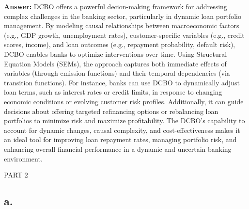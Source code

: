 \documentclass[a4paper,10pt]{article}
\begin{document}
\textbf{Answer:} DCBO offers a powerful decion-making framework for addressing complex challenges in the banking sector, particularly in dynamic loan portfolio management. By modeling causal relationships between macroeconomic factors (e.g., GDP growth, unemployment rates), customer-specific variables (e.g., credit scores, income), and loan outcomes (e.g., repayment probability, default risk), DCBO enables banks to optimize interventions over time. Using Structural Equation Models (SEMs), the approach captures both immediate effects of variables (through emission functions) and their temporal dependencies (via transition functions). For instance, banks can use DCBO to dynamically adjust loan terms, such as interest rates or credit limits, in response to changing economic conditions or evolving customer risk profiles. Additionally, it can guide decisions about offering targeted refinancing options or rebalancing loan portfolios to minimize risk and maximize profitability. The DCBO's capability to account for dynamic changes, causal complexity, and cost-effectiveness makes it an ideal tool for improving loan repayment rates, managing portfolio risk, and enhancing overall financial performance in a dynamic and uncertain banking environment.

\newpage
PART 2

\subsection*{a.}



\clearpage
%

\end{document}
